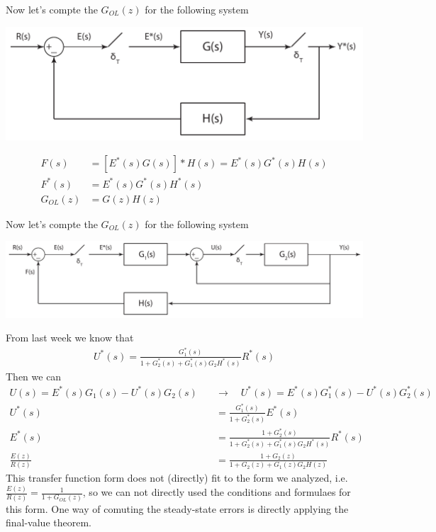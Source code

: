 \documentclass[twoside]{article}
\begin{document}
Now let's compte the $G_{OL}(z)$ for the following system

\begin{center}
\begin{minipage}[h]{0.6\linewidth}
    \begin{center}
      \includegraphics[width=\textwidth]{closed2}
    \end{center}
\end{minipage}
\end{center}

\begin{align*}
F(s) &= [ E^*(s) G(s) ]* H(s) = E^*(s) G^*(s) H(s) 
\\
F^*(s) &= E^*(s) G^*(s) H^*(s)
\\
G_{OL}(z) &= G(z) H(z)
\end{align*}

Now let's compte the $G_{OL}(z)$ for the following system

\begin{center}
\begin{minipage}[h]{\linewidth}
    \begin{center}
      \includegraphics[width=\textwidth]{closed3}
    \end{center}
\end{minipage}
\end{center}

From last week we know that
%
\begin{align*}
U^*(s) = \frac{G_1^*(s)}{1 + G_2^*(s) + G_1^*(s) G_2 H^*(s)} R^*(s)
\end{align*}
%
Then we can 
%
\begin{align*}
U(s) = E^*(s) G_1(s) - U^*(s) G_2(s) \quad &\rightarrow \quad U^*(s) =
       E^*(s) G_1^*(s) - U^*(s) G^*_2(s)
\\
U^*(s) &= \frac{G_1^*(s)}{1 + G^*_2(s)} E^*(s)
\\
E^*(s) &= \frac{1 + G_2^*(s)}{1 + G_2^*(s) + G_1^*(s) G_2 H^*(s)} R^*(s)
\\
\frac{E(z)}{R(z)} &= \frac{1 + G_2(z)}{1 + G_2(z) + G_1(z) G_2 H(z)} 
\end{align*}
%
This transfer function form does not (directly) fit to the form we analyzed,
i.e. $\frac{E(z)}{R(z)} = \frac{1}{1 + G_{OL}(z) }$, so we can not
directly used the conditions and formulaes for this form. One way of
comuting the steady-state errors is directly applying the final-value theorem.
\end{document}
